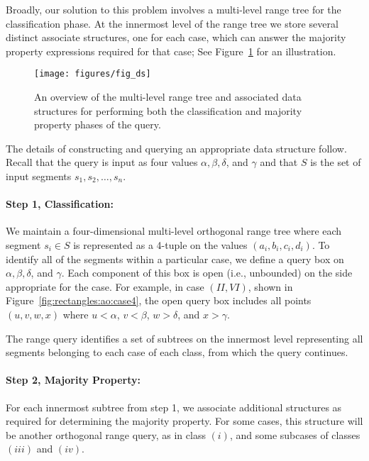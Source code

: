 Broadly, our solution to this problem involves a multi-level range tree for the classification phase. At the innermost level of the range tree we store several distinct associate structures, one for each case, which can answer the majority property expressions required for that case; See Figure~\ref{fig:rectangles:ao:overview} for an illustration.

\begin{figure}[t]
\begin{center}
  \texttt{[image: figures/fig\_ds]}
  \caption[An overview of the multi-level range tree required for arbitrarily-oriented segments]{An overview of the multi-level range tree and associated data structures for performing both the classification and majority property phases of the query.}
  \label{fig:rectangles:ao:overview}
\end{center}
\end{figure}

The details of constructing and querying an appropriate data structure follow. Recall that the query is input as four values $\alpha, \beta, \delta$, and $\gamma$ and that $S$ is the set of input segments $s_1, s_2, \ldots, s_n$.

\paragraph{Step 1, Classification:} We maintain a four-dimensional multi-level orthogonal range tree where each segment $s_i \in S$ is represented as a 4-tuple on the values $(a_i, b_i, c_i, d_i)$. To identify all of the segments within a particular case, we define a query box on $\alpha, \beta, \delta$, and $\gamma$. Each component of this box is open (i.e., unbounded) on the side appropriate for the case. For example, in case $(II, VI)$, shown in Figure~\ref{fig:rectangles:ao:case4}, the open query box includes all points $(u, v, w, x)$ where $u < \alpha$, $v < \beta$, $w > \delta$, and $x > \gamma$.

The range query identifies a set of subtrees on the innermost level representing all segments belonging to each case of each class, from which the query continues.

\paragraph{Step 2, Majority Property:} For each innermost subtree from step 1, we associate additional structures as required for determining the majority property. For some cases, this structure will be another orthogonal range query, as in class $(i)$, and some subcases of classes $(iii)$ and $(iv)$.

